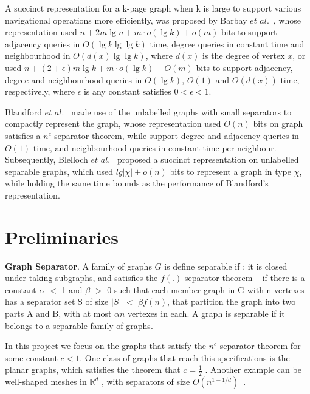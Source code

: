 \documentclass[12pt,glossary]{dalthesis}
\begin{document}
\bigskip
\bigskip

A succinct representation for a k-page graph when k is large to support various navigational
operations more efficiently, was proposed by Barbay $et$ $al.$~\cite{Barbay}, whose representation used $n+2m\lg n + m \cdot o(\lg k) + o(m)$ bits to support adjacency queries in $O(\lg k \lg \lg k)$ time, degree queries in constant time and neighbourhood in $O(d(x) \lg \lg k)$, where $d(x)$ is the degree of vertex $x$, or used $n+(2+\epsilon)m\lg k + m \cdot o(\lg k) + O(m)$ bits to support adjacency, degree and neighbourhood queries in $O(\lg k)$, $O(1)$ and $O(d(x))$ time, respectively, where $\epsilon$ is any constant satisfies $0< \epsilon <1$.   

\bigskip
\bigskip

Blandford $et$ $al.$~\cite{compact-representation} made use of the unlabelled graphs with small separators to compactly represent the graph, whose representation used $O(n)$ bits on graph satisfies a $n^{c}$-separator theorem, while support degree and adjacency queries in $O(1)$ time, and neighbourhood queries in constant time per neighbour. Subsequently, Blelloch $et$ $al.$~\cite{succinct-representation} proposed a succinct representation on unlabelled separable graphs, which used $lg| \chi |+ o(n)$ bits to represent a graph in type $\chi$, while holding the same time bounds as the performance of Blandford's representation.       

\section{Preliminaries}

\textbf{Graph Separator}. A family of graphs $G$ is define separable if : it is closed under taking subgraphs, and satisfies the $f(.)$-separator theorem ~\cite{separator-theorem} if there is a constant $\alpha$ $<$ 1 and $\beta$ $>$ 0 such that each member graph in G with n vertexes has a separator set S of size $|S|$ $<$ $\beta f(n)$, that partition the graph into two parts A and B, with at most $\alpha n$ vertexes in each. A graph is separable if it belongs to a separable family of graphs. 

\bigskip
\bigskip

In this project we focus on the graphs that satisfy the $n^{c}$-separator theorem for some constant $c < 1$. One class of graphs that reach this specifications is the planar graphs, which satisfies the theorem that $c = \frac{1}{2}$ . Another example can be well-shaped meshes in $\mathbb{R}^{d}$ , with separators of size $O(n^{1-1/d})$~\cite{ separators-sphere-packing}.
\end{document}
